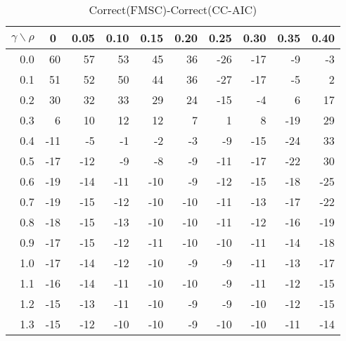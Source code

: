 \documentclass[12pt]{article}
\begin{document}
%
\begin{table}[!tbp]
\caption{Correct(FMSC)-Correct(CC-AIC)}
 \begin{center}
 \begin{tabular}{r|rrrrrrrrr}\hline\hline
\multicolumn{1}{c|}{$\gamma\backslash\rho$}&\multicolumn{1}{c}{0}&\multicolumn{1}{c}{0.05}&\multicolumn{1}{c}{0.10}&\multicolumn{1}{c}{0.15}&\multicolumn{1}{c}{0.20}&\multicolumn{1}{c}{0.25}&\multicolumn{1}{c}{0.30}&\multicolumn{1}{c}{0.35}&\multicolumn{1}{c}{0.40}\tabularnewline
\hline
0.0& 60& 57& 53& 45& 36&-26&-17& -9& -3\tabularnewline
0.1& 51& 52& 50& 44& 36&-27&-17& -5&  2\tabularnewline
0.2& 30& 32& 33& 29& 24&-15& -4&  6& 17\tabularnewline
0.3&  6& 10& 12& 12&  7&  1&  8&-19& 29\tabularnewline
0.4&-11& -5& -1& -2& -3& -9&-15&-24& 33\tabularnewline
0.5&-17&-12& -9& -8& -9&-11&-17&-22& 30\tabularnewline
0.6&-19&-14&-11&-10& -9&-12&-15&-18&-25\tabularnewline
0.7&-19&-15&-12&-10&-10&-11&-13&-17&-22\tabularnewline
0.8&-18&-15&-13&-10&-10&-11&-12&-16&-19\tabularnewline
0.9&-17&-15&-12&-11&-10&-10&-11&-14&-18\tabularnewline
1.0&-17&-14&-12&-10& -9& -9&-11&-13&-17\tabularnewline
1.1&-16&-14&-11&-10&-10& -9&-11&-12&-15\tabularnewline
1.2&-15&-13&-11&-10& -9& -9&-10&-12&-15\tabularnewline
1.3&-15&-12&-10&-10& -9&-10&-10&-11&-14\tabularnewline
\hline
\end{tabular}

\end{center}

\end{table}
\end{document}
